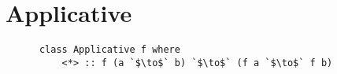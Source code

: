 \documentclass[12pt]{article}
\begin{document}
\section{Applicative}

\begin{definition*}\hspace{0pt}
  \begin{normalfont}
    \begin{verbatim}
      class Applicative f where
          <*> :: f (a `$\to$` b) `$\to$` (f a `$\to$` f b)
    \end{verbatim}
  \end{normalfont}
\end{definition*}
\end{document}

